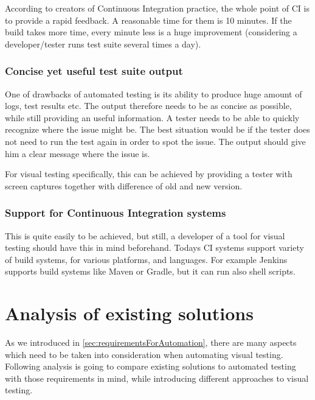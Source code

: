 \documentclass[11pt,oneside,final]{fithesis2}
\begin{document}
    According to creators of Continuous Integration practice, the whole point of CI is to provide a rapid feedback. A reasonable time for them is 10 minutes. If the build
    takes more time, every minute less is a huge improvement (considering a developer/tester runs test suite several times a day).
    
    \subsection{Concise yet useful test suite output}
    One of drawbacks of automated testing is its ability to produce huge amount of logs, test results etc. The output therefore needs to be as concise as possible, while still providing
    an useful information. A tester needs to be able to quickly recognize where the issue might be. The best situation would be if the tester does not need to run the test again in order
    to spot the issue. The output should give him a clear message where the issue is.
    
    For visual testing specifically, this can be achieved by providing a tester with screen captures together with difference of old and new version.
    
    \subsection{Support for Continuous Integration systems}
    This is quite easily to be achieved, but still, a developer of a tool for visual testing should have this in mind beforehand. Todays CI systems support variety of build systems, for
    various platforms, and languages. For example Jenkins supports build systems like Maven or Gradle, but it can run also shell scripts.
    
    
\chapter{Analysis of existing solutions}
\label{chap:analysis}
As we introduced in \ref{sec:requirementsForAutomation}, there are many aspects which need to be taken into consideration when automating visual
testing. Following analysis is going to compare existing solutions to automated testing with those requirements in mind, while introducing
different approaches to visual testing.
\end{document}

